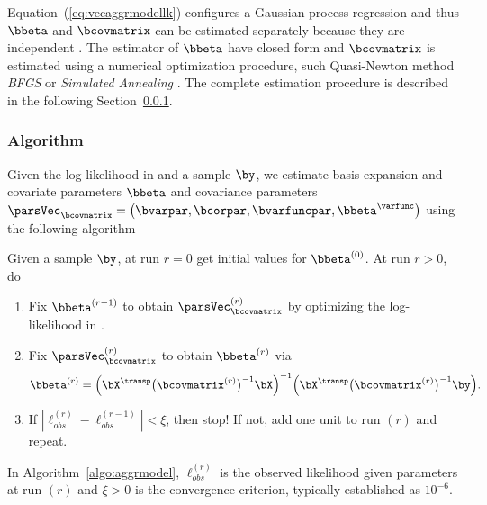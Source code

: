 Equation~(\ref{eq:vecaggrmodellk}) configures a Gaussian process regression and thus $\bbeta$ and $\bcovmatrix$ can be estimated separately because they are independent \cite{shi2011gaussian,ramsay2005functional}. The estimator of $\bbeta$ have closed form and $\bcovmatrix$ is estimated using a numerical optimization procedure, such Quasi-Newton method \textit{BFGS} or \textit{Simulated Annealing} \cite{fletcher2013practical,kirkpatrick1983optimization,ruggiero1997calculo}. The complete estimation procedure is described in the following Section~\ref{sec:aggralgorithm}.


\subsubsection{Algorithm} \label{sec:aggralgorithm}

Given the log-likelihood in  and a sample $\by$, we estimate basis expansion and covariate parameters $\bbeta$ and covariance parameters $\parsVec_{\bcovmatrix} = \bigl( \bvarpar,\bcorpar,\bvarfuncpar,\bbeta^\varfunc \bigr)$ using the following algorithm

\begin{algo} \label{algo:aggrmodel}
  Given a sample $\by$, at run $r=0$ get initial values for $\bbeta^{(0)}$. At run $r>0$, do
  \begin{enumerate}
  \item Fix $\bbeta^{(r-1)}$ to obtain $\parsVec_{\bcovmatrix}^{(r)}$ by optimizing the log-likelihood in .
  \item Fix $\parsVec_{\bcovmatrix}^{(r)}$ to obtain $\bbeta^{(r)}$ via
    \begin{equation}
      \label{eq:betahat}
      \bbeta^{(r)}
      =
      \Bigl(
      \bX^\transp
      \bigl(\bcovmatrix^{(r)}\bigr)^{-1}
      \bX
      \Bigr)^{-1}
      \Bigl(
      \bX^\transp
      \bigl(\bcovmatrix^{(r)}\bigr)^{-1}
      \by
      \Bigr).
    \end{equation}
  \item If $|\ell_{obs}^{(r)} - \ell_{obs}^{(r-1)}| < \xi$, then stop! If not, add one unit to run $(r)$ and repeat.
  \end{enumerate}
\end{algo}

In Algorithm~\ref{algo:aggrmodel}, $\ell_{obs}^{(r)}$ is the observed likelihood given parameters at run $(r)$ and $\xi>0$ is the convergence criterion, typically established as $10^{-6}$.

